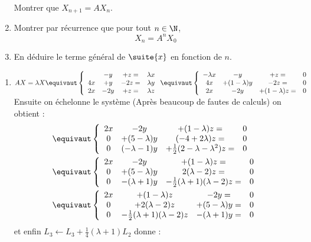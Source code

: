 \documentclass[a4paper, 11pt,reqno]{article}
\begin{document}
\begin{exercice}
\begin{enumerate}
Montrer que $X_{n+1} = A X_n$. 
\item Montrer par récurrence que pour tout $n\in \N$, $$X_n = A^n X_0$$
\item En déduire le terme général de $\suite{x}$ en fonction de $n$. 
\end{enumerate} 
\end{exercice}
\begin{correction}
\begin{enumerate}
\item $AX= \lambda X \equivaut \left\{ \begin{array}{cccc}
&-y&+z=&\lambda x\\
4x &+y&-2z=&\lambda y\\
2x &-2y&+z=&\lambda z
\end{array}
\right.\equivaut \left\{ \begin{array}{cccc}
-\lambda x&-y&+z=&0\\
4x &+(1-\lambda)y&-2z=&0\\
2x &-2y&+(1-\lambda) z=&0
\end{array}
\right.$  
Ensuite on échelonne le système (Après beaucoup de fautes de calculs) on obtient :
\begin{align*}
&\equivaut \left\{ \begin{array}{cccc}
2x &-2y&+(1-\lambda) z=&0\\
0 &+(5-\lambda)y&(-4+2\lambda) z=&0\\
0 &(-\lambda -1) y&+\frac{1}{2}(2-\lambda-\lambda^2) z=&0
\end{array}
\right.\\
&\equivaut \left\{ \begin{array}{cccc}
2x &-2y&+(1-\lambda) z=&0\\
0 &+(5-\lambda)y&2(\lambda-2) z=&0\\
0 &-(\lambda +1) y&-\frac{1}{2}(\lambda+1)(\lambda-2) z=&0
\end{array}
\right.\\
&\equivaut \left\{ \begin{array}{cccc}
2x &+(1-\lambda) z&-2y=&0\\
0 &+2(\lambda-2) z &+(5-\lambda)y=&0\\
0 &-\frac{1}{2}(\lambda+1)(\lambda-2) z&-(\lambda +1) y=&0
\end{array}
\right.
\end{align*}
et enfin $L_3\leftarrow L_3+\frac{1}{4}(\lambda+1) L_2$ donne : 


\end{enumerate}
\end{correction}
\end{document}
